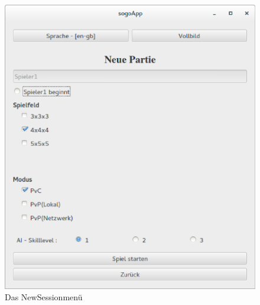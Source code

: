 \documentclass[a4paper]{scrartcl}
\begin{document}
\begin{figure}[H]
 \centering
 \includegraphics[scale=0.35]{graphics/newsession.eps}
 \caption{Das NewSessionmenü}
 \label{fig:NewSessionmenü}
\end{figure}
\end{document}
